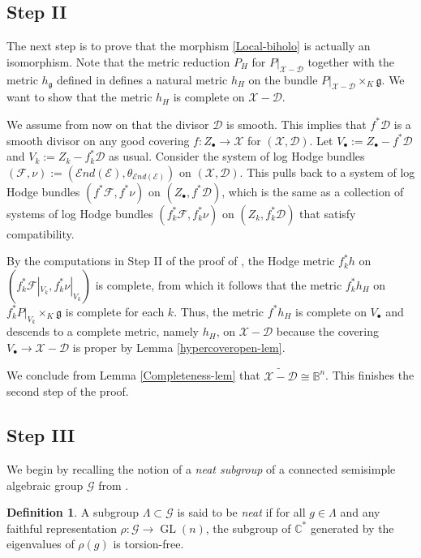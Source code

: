 \documentclass[a4paper]{amsart}
\theoremstyle{definition}
\newtheorem{definition}[theorem]{Definition}
\def\gl{\mathop{\mathrm{GL}}\nolimits}
\begin{document}
\subsection*{Step II} The next step is to prove that the morphism \ref{Local-biholo} is actually an isomorphism. Note that the metric reduction $P_H$ for $P|_{\mathscr{X}-\mathscr{D}}$ together with the metric $h_{\mathfrak{g}}$ defined in \cite[3.0.1]{dengcadorel} defines a natural metric $h_H$ on the bundle $P|_{\mathscr{X}-\mathscr{D}}\times_K\mathfrak{g}$. We want to show that the metric $h_H$ is complete on $\mathscr{X}-\mathscr{D}$. 

We assume from now on that the divisor $\mathscr{D}$ is smooth. This implies that $f^*\mathscr{D}$ is a smooth divisor on any good covering $f:Z_\bullet\to \mathscr{X}$ for $(\mathscr{X},\mathscr{D})$. Let $V_\bullet:=Z_\bullet-f^*\mathscr{D}$ and $V_k:=Z_k-f_k^*\mathscr{D}$ as usual. Consider the system of log Hodge bundles $(\mathcal{F},\nu):=(\mathcal{E}nd(\mathcal{E}),\theta_{\mathcal{E}nd(\mathcal{E})})$ on $(\mathscr{X},\mathscr{D})$. This pulls back to a system of log Hodge bundles $(f^*\mathcal{F},f^*\nu)$ on $(Z_\bullet,f^*\mathscr{D})$, which is the same as a collection of systems of log Hodge bundles $(f_k^*\mathcal{F},f_k^*\nu)$ on $(Z_k,f_k^*\mathscr{D})$ that satisfy compatibility. 

By the computations in Step II of the proof of \cite[Theorem 5.7(i)]{dengcadorel}, the Hodge metric $f_k^*h$ on $(f_k^*\mathcal{F}|_{V_k},f_k^*\nu|_{V_k})$ is complete, from which it follows that the metric $f_k^*h_H$ on $f_k^*P|_{V_k}\times_K\mathfrak{g}$ is complete for each $k$. Thus, the metric $f^*h_H$ is complete on $V_\bullet$ and descends to a complete metric, namely $h_H$, on $\mathscr{X}-\mathscr{D}$ because the covering $V_\bullet\to\mathscr{X}-\mathscr{D}$ is proper by Lemma \ref{hypercoveropen-lem}. 

We conclude from Lemma \ref{Completeness-lem} that $\widetilde{\mathscr{X}-\mathscr{D}}\cong\mathbb{B}^n$. This finishes the second step of the proof.

\subsection*{Step III} We begin by recalling the notion of a \emph{neat subgroup} of a connected semisimple algebraic group $\mathscr{G}$ from \cite[Chapter 17.1]{Borel69}.

\begin{definition}
    A subgroup $\Lambda\subset\mathscr{G}$ is said to be \emph{neat} if for all $g\in\Lambda$ and any faithful representation $\rho:\mathscr{G}\to\gl(n)$, the subgroup of $\mathbb{C}^*$ generated by the eigenvalues of $\rho(g)$ is torsion-free.
\end{definition}
\end{document}
